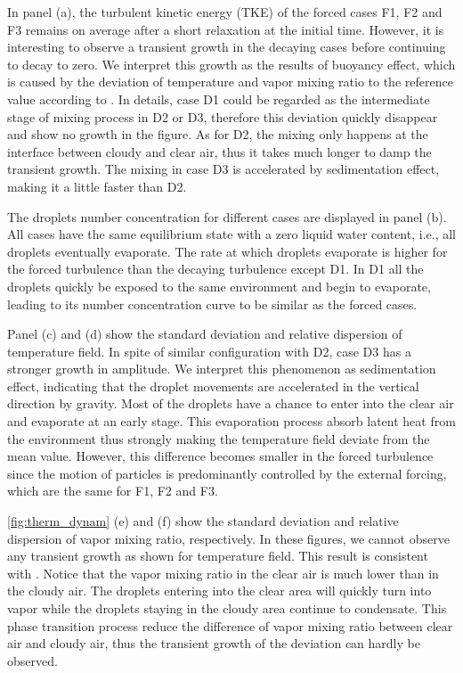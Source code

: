 In panel (a), the turbulent kinetic energy (TKE) of the forced cases F1, F2 and
F3 remains on average after a short relaxation at the initial time. However, it
is interesting to observe a transient growth in the decaying cases before
continuing to decay to zero. We interpret this growth as the results of
buoyancy effect, which is caused by the deviation of temperature and vapor
mixing ratio to the reference value according to . In
details, case D1 could be regarded as the intermediate stage of mixing process
in D2 or D3, therefore this deviation quickly disappear and show no growth in
the figure. As for D2, the mixing only happens at the interface between cloudy
and clear air, thus it takes much longer to damp the transient growth. The
mixing in case D3 is accelerated by sedimentation effect, making it a little
faster than D2.

The droplets number concentration for different cases are displayed in panel
(b). All cases have the same equilibrium state with a zero liquid water
content, i.e., all droplets eventually evaporate. The rate at which droplets
evaporate is higher for the forced turbulence than the decaying turbulence
except D1. In D1 all the droplets quickly be exposed to the same environment
and begin to evaporate, leading to its number concentration curve to be similar
as the forced cases.

Panel (c) and (d) show the standard deviation and relative dispersion of
temperature field. In spite of similar configuration with D2, case D3 has a
stronger growth in amplitude. We interpret this phenomenon as sedimentation
effect, indicating that the droplet movements are accelerated in the vertical
direction by gravity. Most of the droplets have a chance to enter into the
clear air and evaporate at an early stage. This evaporation process absorb
latent heat from the environment thus strongly making the temperature field
deviate from the mean value. However, this difference becomes smaller in the
forced turbulence since the motion of particles is predominantly controlled by
the external forcing, which are the same for F1, F2 and F3.

\ref{fig:therm_dynam} (e) and (f) show the standard deviation and relative
dispersion of vapor mixing ratio, respectively. In these figures, we cannot
observe any transient growth as shown for temperature field. This result is
consistent with \cite{Kumar14}. Notice that the vapor mixing ratio in the clear
air is much lower than in the cloudy air. The droplets entering into the clear
area will quickly turn into vapor while the droplets staying in the cloudy area
continue to condensate. This phase transition process reduce the difference of
vapor mixing ratio between clear air and cloudy air, thus the transient growth
of the deviation can hardly be observed.

